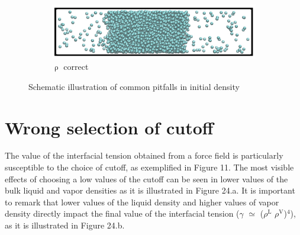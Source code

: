 \documentclass{scrbook}
\begin{document}
\begin{figure}
\begin{subfigure}{0.4\textwidth}
	\end{subfigure}
	\begin{subfigure}{0.4\textwidth} %
    \includegraphics[width=1\textwidth]{gfx/Fig_23c.jpeg}
    \caption{${\uprho}$ correct}
	\end{subfigure}
\caption{Schematic illustration of common pitfalls in initial density}
\label{fig:23}
\end{figure}

\section{Wrong selection of cutoff}

The value of the interfacial tension obtained from a force field is
particularly susceptible to the choice of cutoff, as exemplified in Figure 11.
The most visible effects of choosing a low values of the cutoff can be seen in
lower values of the bulk liquid and vapor densities as it is illustrated in
Figure 24.a. It is important to remark that lower values of the liquid density
and higher values of vapor density directly impact the final value of the
interfacial tension ({${\gamma}$}  ${\simeq}$ (${\rho}$$^{\mathrm{L}}$
\textendash{} ${\rho}$$^{\mathrm{V}}$)$^{4}$), as it is illustrated in Figure
24.b.
\end{document}
